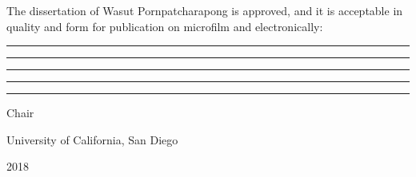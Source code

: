 \newpage
\thispagestyle{plain}


\doublespacing

\vspace*{\fill}

\begin{spacing}{1.0}
\noindent The dissertation of Wasut Pornpatcharapong is approved, and it is acceptable in quality and form
for publication on microfilm and electronically:
\end{spacing}

\vspace{0.35cm}

\par\noindent\rule{\textwidth}{0.5pt}

\vspace{0.35cm}

\par\noindent\rule{\textwidth}{0.5pt}

\vspace{0.35cm}

\par\noindent\rule{\textwidth}{0.5pt}

\vspace{0.35cm}

\par\noindent\rule{\textwidth}{0.5pt}

\vspace{0.35cm}

\par\noindent\rule{\textwidth}{0.5pt}

\begin{flushright}
    {Chair}
\end{flushright}

\begin{center}
    University of California, San Diego
 
    2018
\end{center}

\vspace*{\fill}
